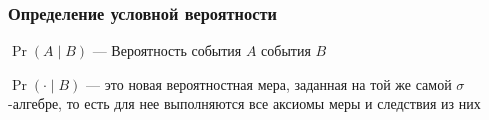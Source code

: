 \documentclass[hyperref=unicode,graphics=pdflatex,13pt,xcolor={usenames,dvipsnames}]{beamer}
\newcommand\hl[1]{{\color{blue}{#1}}}
\begin{document}
\begin{frame}
  \frametitle{Определение условной вероятности}
  \begin{center}
  \end{center}

  \vspace{1em}

  $\Pr(A \mid B)$ --- Вероятность события $A$ \hl{при условии} события $B$

  \vspace{1em}
  \pause

  \hl{NB:} $\Pr(\cdot \mid B)$ --- это новая вероятностная мера, заданная на той же самой $\sigma$-алгебре, то есть для нее выполняются все аксиомы меры и следствия из них
\end{frame}
\end{document}
